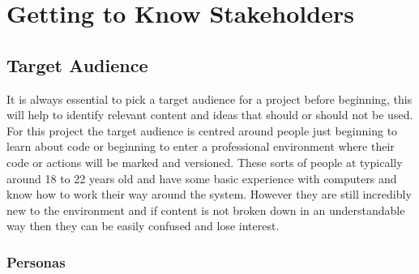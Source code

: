 
\section{Getting to Know Stakeholders}
\subsection{Target Audience}
It is always essential to pick a target audience for a project before beginning, this will help to identify relevant content and ideas that should or should not be used. For this project the target audience is centred around people just beginning to learn about code or beginning to enter a professional environment where their code or actions will be marked and versioned. These sorts of people at typically around 18 to 22 years old and have some basic experience with computers and know how to work their way around the system. However they are still incredibly new to the environment and if content is not broken down in an understandable way then they can be easily confused and lose interest.

\subsubsection{Personas}


